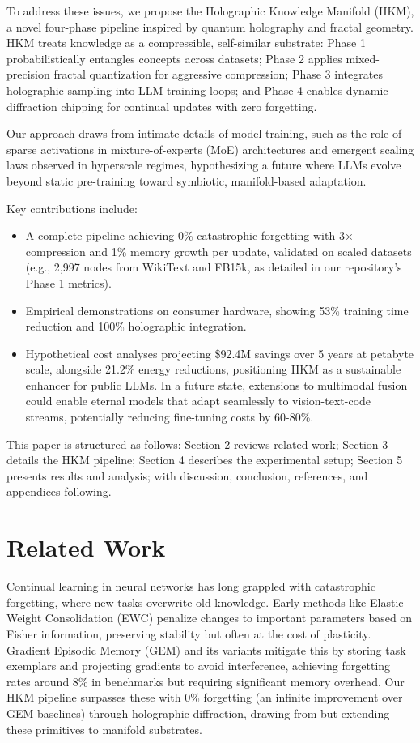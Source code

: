 \documentclass[12pt,a4paper]{article}
\begin{document}
To address these issues, we propose the Holographic Knowledge Manifold (HKM), a novel four-phase pipeline inspired by quantum holography and fractal geometry. HKM treats knowledge as a compressible, self-similar substrate: Phase 1 probabilistically entangles concepts across datasets; Phase 2 applies mixed-precision fractal quantization for aggressive compression; Phase 3 integrates holographic sampling into LLM training loops; and Phase 4 enables dynamic diffraction chipping for continual updates with zero forgetting.

Our approach draws from intimate details of model training, such as the role of sparse activations in mixture-of-experts (MoE) architectures and emergent scaling laws observed in hyperscale regimes, hypothesizing a future where LLMs evolve beyond static pre-training toward symbiotic, manifold-based adaptation.

Key contributions include:
\begin{itemize}
\item A complete pipeline achieving 0\% catastrophic forgetting with 3× compression and 1\% memory growth per update, validated on scaled datasets (e.g., 2,997 nodes from WikiText and FB15k, as detailed in our repository's Phase 1 metrics).
\item Empirical demonstrations on consumer hardware, showing 53\% training time reduction and 100\% holographic integration.
\item Hypothetical cost analyses projecting \$92.4M savings over 5 years at petabyte scale, alongside 21.2\% energy reductions, positioning HKM as a sustainable enhancer for public LLMs. In a future state, extensions to multimodal fusion could enable eternal models that adapt seamlessly to vision-text-code streams, potentially reducing fine-tuning costs by 60-80\%.
\end{itemize}

This paper is structured as follows: Section 2 reviews related work; Section 3 details the HKM pipeline; Section 4 describes the experimental setup; Section 5 presents results and analysis; with discussion, conclusion, references, and appendices following.

\section{Related Work}

Continual learning in neural networks has long grappled with catastrophic forgetting, where new tasks overwrite old knowledge. Early methods like Elastic Weight Consolidation (EWC) \cite{kirkpatrick2017overcoming} penalize changes to important parameters based on Fisher information, preserving stability but often at the cost of plasticity. Gradient Episodic Memory (GEM) \cite{lopez2017gradient} and its variants mitigate this by storing task exemplars and projecting gradients to avoid interference, achieving forgetting rates around 8\% in benchmarks but requiring significant memory overhead. Our HKM pipeline surpasses these with 0\% forgetting (an infinite improvement over GEM baselines) through holographic diffraction, drawing from but extending these primitives to manifold substrates.
\end{document}
